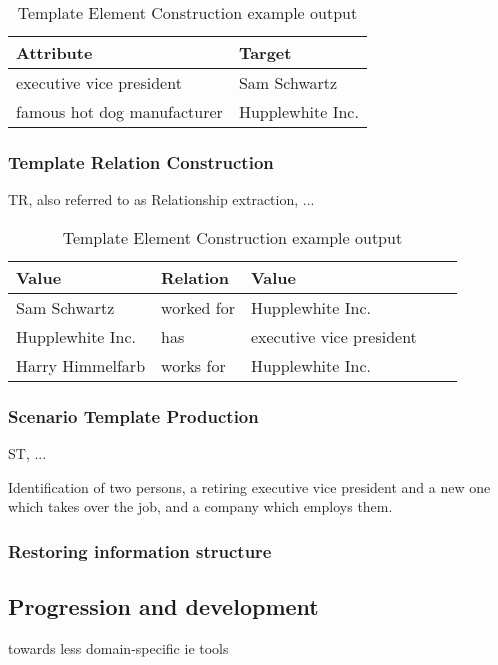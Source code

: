 \begin{table}[H]
\centering
\begin{tabular*}{\textwidth}{ l  l }
	\toprule
	\textbf{Attribute} & \textbf{Target} \\
	\midrule
	executive vice president & Sam Schwartz \\
	famous hot dog manufacturer & Hupplewhite Inc. \\
	\bottomrule
\end{tabular*}
\caption{Template Element Construction example output}
\end{table}

\subsubsection{Template Relation Construction}
\gls{TR}, also referred to as Relationship extraction, ...

\begin{table}[H]
\centering
\begin{tabular*}{\textwidth}{ l l l l l }
	\toprule
	\textbf{Value} & \textbf{Relation}  & \textbf{Value} \\
	\midrule
	Sam Schwartz & worked for & Hupplewhite Inc. \\
	Hupplewhite Inc. & has & executive vice president \\
	Harry Himmelfarb & works for & Hupplewhite Inc. \\
	\bottomrule
\end{tabular*}
\caption{Template Element Construction example output}
\end{table}

\subsubsection{Scenario Template Production}
\gls{ST}, ...

Identification of two persons, a retiring executive vice president and a new one which takes over the job, and a company which employs them.

\subsubsection{Restoring information structure}

\newpage
\subsection{Progression and development}
towards less domain-specific ie tools

